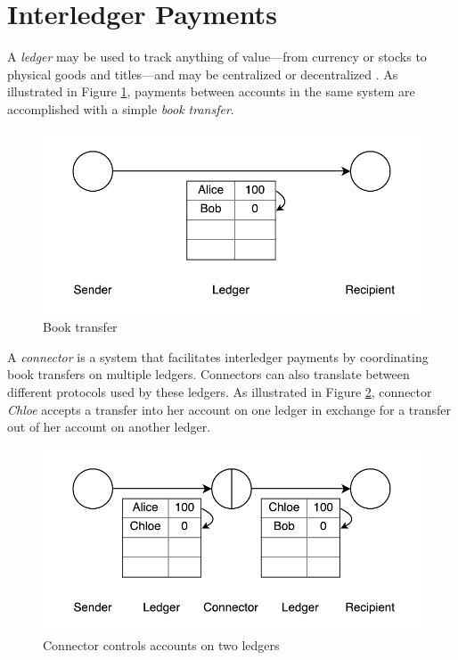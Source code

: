 \documentclass[letterpaper,twocolumn,10pt]{article}
\begin{document}
\section{Interledger Payments}
\label{sec:model}

A \textit{ledger} may be used to track anything of value---from currency or stocks to physical goods and titles---and may be centralized or decentralized \cite{Bitcoin}. As illustrated in Figure \ref{fig:three-bells}, payments between accounts in the same system are accomplished with a simple \textit{book transfer}.

\begin{figure}[ht]
    \centering
    \includegraphics[width=\columnwidth]{figures/three-bells.pdf}
    \caption{Book transfer}
    \label{fig:three-bells}
\end{figure}

A \textit{connector} is a system that facilitates interledger payments by coordinating book transfers on multiple ledgers. Connectors can also translate between different protocols used by these ledgers. As illustrated in Figure \ref{fig:connector}, connector \textit{Chloe} accepts a transfer into her account on one ledger in exchange for a transfer out of her account on another ledger.

\begin{figure}[ht]
    \centering
    \includegraphics[width=\columnwidth]{figures/connector.pdf}
    \caption{Connector controls accounts on two ledgers}
    \label{fig:connector}
\end{figure}
\end{document}
